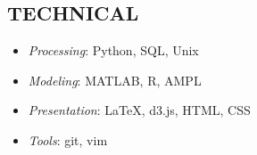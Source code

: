 \documentclass[geomargin]{res}
\begin{document}
\begin{resume}
%


\section{TECHNICAL}

\begin{minipage}[t]{0.5\textwidth}
\begin{itemize}
 \item 
    \textit{Processing}: Python, SQL, Unix
\item
\textit{Modeling}: MATLAB, R, AMPL
\end{itemize}
\end{minipage}
\begin{minipage}[t]{0.5\textwidth}
\begin{itemize}
\item
    \textit{Presentation}: \LaTeX, d3.js, HTML, CSS
\item
    \textit{Tools}: git, vim
\end{itemize}
\end{minipage}
\vspace{-2mm}



\end{resume}
\end{document}
